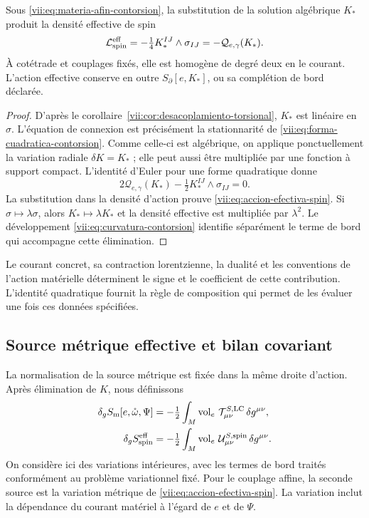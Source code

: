 \begin{theorem}
\label{vii:thm:respuesta-cuadratica}
Sous \eqref{vii:eq:materia-afin-contorsion}, la substitution de la
solution algébrique \(K_*\) produit la densité effective de spin
\begin{equation}
 \mathcal L_{\rm spin}^{\rm eff}
 =-\tfrac14 K_*^{IJ}\wedge\sigma_{IJ}
 =-\mathcal Q_{e,\gamma}(K_*).
 \label{vii:eq:accion-efectiva-spin}
\end{equation}
À cotétrade et couplages fixés, elle est homogène de degré deux en
le courant. L'action effective conserve en outre
\(S_\partial[e,K_*]\), ou sa complétion de bord déclarée.
\end{theorem}
\begin{proof}
D'après le corollaire~\ref{vii:cor:desacoplamiento-torsional},
\(K_*\) est linéaire en \(\sigma\). L'équation de connexion est
précisément la stationnarité de
\eqref{vii:eq:forma-cuadratica-contorsion}. Comme celle-ci est algébrique,
on applique ponctuellement la variation radiale \(\delta K=K_*\) ;
elle peut aussi être multipliée par une fonction à support compact.
L'identité d'Euler pour une forme quadratique donne
\[
 2\mathcal Q_{e,\gamma}(K_*)
             -\tfrac12K_*^{IJ}\wedge\sigma_{IJ}=0.
\]
La substitution dans la densité d'action prouve \eqref{vii:eq:accion-efectiva-spin}. Si \(\sigma\mapsto\lambda\sigma\), alors \(K_*\mapsto\lambda K_*\) et la densité effective est multipliée par \(\lambda^2\). Le développement \eqref{vii:eq:curvatura-contorsion} identifie séparément le terme de bord qui accompagne cette élimination.
\end{proof}

Le courant concret, sa contraction lorentzienne, la dualité et les
conventions de l'action matérielle déterminent le signe et le coefficient
de cette contribution. L'identité quadratique fournit la règle de
composition qui permet de les évaluer une fois ces données spécifiées.

\subsection{Source métrique effective et bilan covariant}
\label{vii:subsec:fuente-metrica-efectiva}

La normalisation de la source métrique est fixée dans la même droite d'action. Après élimination de \(K\), nous définissons
\begin{align}
 \delta_g S_{\rm m}[e,\mathring\omega,\Psi]
 &=-\tfrac12\int_M\operatorname{vol}_e\,
                   \mathcal T^{S,\rm LC}_{\mu\nu}\,\delta g^{\mu\nu},
 \\
 \delta_g S_{\rm spin}^{\rm eff}
 &=-\tfrac12\int_M\operatorname{vol}_e\,
                   \mathcal U^{S,\rm spin}_{\mu\nu}\,\delta g^{\mu\nu}.
 \label{vii:eq:fuentes-normalizadas-accion}
\end{align}
On considère ici des variations intérieures, avec les termes de bord
traités conformément au problème variationnel fixé. Pour le couplage
affine, la seconde source est la variation métrique de
\eqref{vii:eq:accion-efectiva-spin}. La variation inclut la dépendance
du courant matériel à l'égard de \(e\) et de \(\Psi\).

